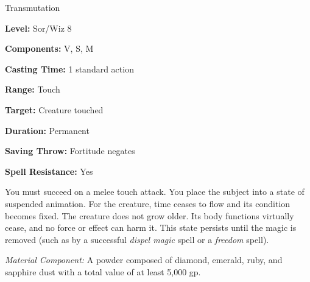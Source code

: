 
Transmutation

\textbf{Level:} Sor/Wiz 8

\textbf{Components:} V, S, M

\textbf{Casting Time:} 1 standard action

\textbf{Range:} Touch

\textbf{Target:} Creature touched

\textbf{Duration:} Permanent

\textbf{Saving Throw:} Fortitude negates

\textbf{Spell Resistance:} Yes

You must succeed on a melee touch attack. You place the subject into a state of 
suspended animation. For the creature, time ceases to flow and its condition becomes 
fixed. The creature does not grow older. Its body functions virtually cease, and 
no force or effect can harm it. This state persists until the magic is removed 
(such as by a successful \textit{dispel magic} spell or a \textit{freedom} spell).

\textit{Material Component:} A powder composed of diamond, emerald, ruby, and sapphire 
dust with a total value of at least 5,000 gp.

